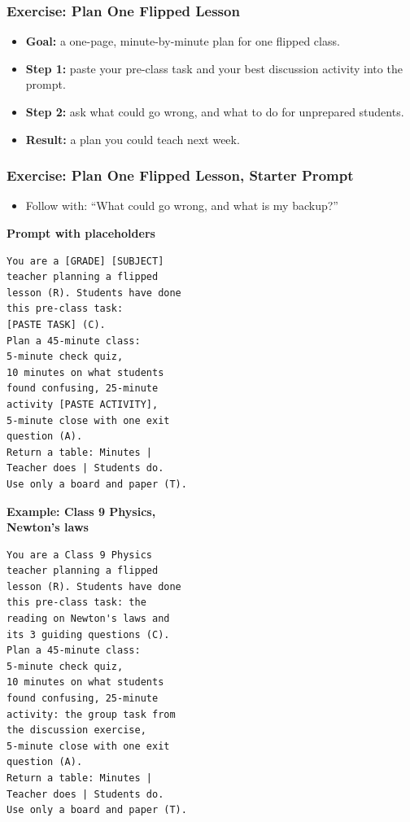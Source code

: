 \begin{frame}[fragile]\frametitle{Exercise: Plan One Flipped Lesson}
\begin{itemize}
\item \textbf{Goal:} a one-page, minute-by-minute plan for one flipped class.
\item \textbf{Step 1:} paste your pre-class task and your best discussion activity into the prompt.
\item \textbf{Step 2:} ask what could go wrong, and what to do for unprepared students.
\item \textbf{Result:} a plan you could teach next week.
\end{itemize}
\end{frame}

\begin{frame}[fragile]\frametitle{Exercise: Plan One Flipped Lesson, Starter Prompt}
\begin{itemize}
\item Follow with: ``What could go wrong, and what is my backup?''
\end{itemize}
\PairBegin
{\footnotesize\textbf{Prompt with placeholders}\\\mbox{}}
\begin{lstlisting}[language={},numbers=none]
You are a [GRADE] [SUBJECT]
teacher planning a flipped
lesson (R). Students have done
this pre-class task:
[PASTE TASK] (C).
Plan a 45-minute class:
5-minute check quiz,
10 minutes on what students
found confusing, 25-minute
activity [PASTE ACTIVITY],
5-minute close with one exit
question (A).
Return a table: Minutes |
Teacher does | Students do.
Use only a board and paper (T).
\end{lstlisting}
\PairMid
{\footnotesize\textbf{Example: Class 9 Physics,\\ Newton's laws}}
\begin{lstlisting}[language={},numbers=none]
You are a Class 9 Physics
teacher planning a flipped
lesson (R). Students have done
this pre-class task: the
reading on Newton's laws and
its 3 guiding questions (C).
Plan a 45-minute class:
5-minute check quiz,
10 minutes on what students
found confusing, 25-minute
activity: the group task from
the discussion exercise,
5-minute close with one exit
question (A).
Return a table: Minutes |
Teacher does | Students do.
Use only a board and paper (T).
\end{lstlisting}
\PairEnd
\end{frame}

